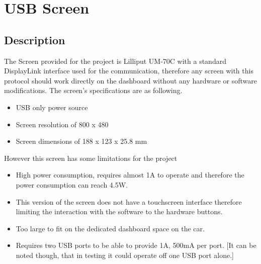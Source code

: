 \documentclass[11pt]{report} %
\begin{document}
	\section{USB Screen}
	\label{sec:screen}
		\subsection{Description}
		The Screen provided for the project is Lilliput UM-70C with a standard
		DisplayLink interface used for the communication, therefore any screen with
		this protocol should work directly on the dashboard without any hardware
		or software modifications. The screen's specifications are as following.
	
		\begin{itemize}
			\item USB only power source
			\item Screen resolution of 800 x 480
			\item Screen dimensions of 188 x 123 x 25.8 mm
		\end{itemize}
	
		However this screen has some limitations for the project
	
		\begin{itemize}
			\item High power consumption, requires almost 1A to operate and
			therefore the power consumption can reach 4.5W.
			\item This version of the screen does not have a touchscreen interface
			therefore limiting the interaction with the software to the hardware
			buttons.
			\item Too large to fit on the dedicated dashboard space on the car.
			\item Requires two USB ports to be able to provide 1A, 500mA per port. 
					[It can be noted though, that in testing it could operate off 
					one USB port alone.]
		\end{itemize}
\end{document}
